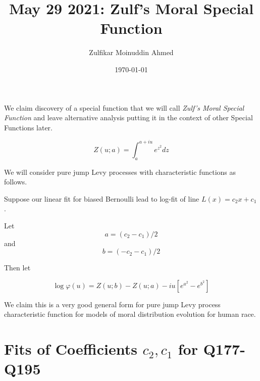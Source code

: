 \documentclass{amsart}
\title{May 29 2021:  Zulf's Moral Special Function}
\author{Zulfikar Moinuddin Ahmed}
\date{\today}
\begin{document}
\maketitle

We claim discovery of a special function that we will call {\em Zulf's Moral Special Function} and leave alternative analysis putting it in the context of other Special Functions later.

\[
Z(u;a) = \int_{a}^{a+iu} e^{z^2} dz
\]

We will consider pure jump Levy processes with characteristic functions as follows.

Suppose our linear fit for biased Bernoulli lead to log-fit of line $L(x) = c_2 x+c_1$.  

Let
\[
a = (c_2-c_1)/2
\]
and
\[
b = (-c_2 - c_1)/2
\]

Then let

\begin{equation}
\log \varphi(u) = Z(u;b) - Z(u; a) - iu [e^{a^2}-e^{b^2}]
\end{equation}

We claim this is a very good general form for pure jump Levy process characteristic function for models of moral distribution evolution for human race.

\section{Fits of Coefficients $c_2,c_1$ for Q177-Q195}
\end{document}
